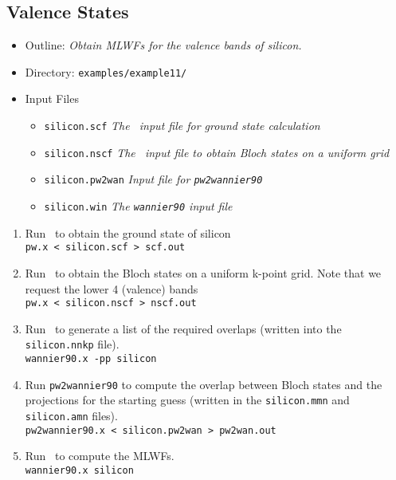 \documentclass[a4paper,11pt,twoside]{article}
\begin{document}
\subsection*{Valence States}
\begin{itemize}
\item{Outline: \it{Obtain MLWFs for the valence bands of silicon.}}
\item{Directory: {\tt examples/example11/}}
\item{Input Files}
\begin{itemize}
\item{ {\tt silicon.scf}  {\it The \pwscf\ input file for ground state
    calculation}} 
\item{ {\tt silicon.nscf}  {\it The \pwscf\ input file to obtain Bloch
    states on a uniform grid}} 
\item{ {\tt silicon.pw2wan}  {\it Input file for {\tt pw2wannier90}}}
\item{ {\tt silicon.win}  {\it The {\tt wannier90} input file}}
\end{itemize}

\end{itemize}

\begin{enumerate}
\item Run \pwscf\ to obtain the ground state of silicon\\
{\tt pw.x < silicon.scf > scf.out}

\item Run \pwscf\ to obtain the Bloch states on a uniform k-point
  grid. Note that we request the lower 4 (valence) bands\\ 
{\tt pw.x < silicon.nscf > nscf.out}

\item Run \wannier\ to generate a list of the required overlaps (written
  into the {\tt silicon.nnkp} file).\\
{\tt wannier90.x -pp silicon}

\item Run {\tt pw2wannier90} to compute the overlap between Bloch
  states and the projections for the starting guess (written in the
  {\tt silicon.mmn} and {\tt  silicon.amn} files).\\
{\tt pw2wannier90.x < silicon.pw2wan > pw2wan.out}

\item Run \wannier\ to compute the MLWFs.\\
{\tt wannier90.x silicon}

\end{enumerate}
\end{document}

